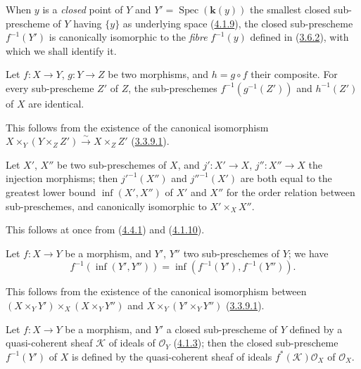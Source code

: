 When $y$ is a \emph{closed} point of $Y$ and
$Y'=\operatorname{Spec}(\boldsymbol{k}(y))$ the smallest closed sub-prescheme of $Y$ having
$\{y\}$ as underlying space (\hyperref[I.4.1.9]{4.1.9}), the
closed sub-prescheme $f^{-1}(Y')$ is canonically isomorphic to the
\emph{fibre} $f^{-1}(y)$ defined in (\hyperref[I.3.6.2]{3.6.2}), with
which we shall identify it.

\begin{corollary}[4.4.2]
\label{I.4.4.2}
Let $f:X\to Y$, $g:Y\to Z$ be two morphisms, and $h=g\circ f$ their
composite. For every sub-prescheme $Z'$ of $Z$, the sub-preschemes
$f^{-1}(g^{-1}(Z'))$ and $h^{-1}(Z')$ of $X$ are identical.
\end{corollary}

This follows from the existence of the canonical isomorphism
$X\times_Y(Y\times_Z Z')\xrightarrow{\sim}X\times_Z Z'$
(\hyperref[I.3.3.9.1]{3.3.9.1}).

\begin{corollary}[4.4.3]
\label{I.4.4.3}
Let $X'$, $X''$ be two sub-preschemes of $X$, and $j':X'\to X$,
$j'':X''\to X$ the injection morphisms; then ${j'}^{-1}(X'')$ and
${j''}^{-1}(X')$ are both equal to the greatest lower bound
$\inf(X',X'')$ of $X'$ and $X''$ for the order relation between
sub-preschemes, and canonically isomorphic to $X'\times_X X''$.
\end{corollary}

This follows at once from (\hyperref[I.4.4.1]{4.4.1}) and
(\hyperref[I.4.1.10]{4.1.10}).

\begin{corollary}[4.4.4]
\label{I.4.4.4}
Let $f:X\to Y$ be a morphism, and $Y'$, $Y''$ two sub-preschemes of $Y$;
we have
\[
  f^{-1}(\inf(Y',Y''))=\inf(f^{-1}(Y'),f^{-1}(Y'')).
\]
\end{corollary}

This follows from the existence of the canonical isomorphism between
$(X\times_Y Y')\times_X(X\times_Y Y'')$ and
$X\times_Y(Y'\times_Y Y'')$ (\hyperref[I.3.3.9.1]{3.3.9.1}).

\begin{proposition}[4.4.5]
\label{I.4.4.5}
Let $f:X\to Y$ be a morphism, and $Y'$ a closed sub-prescheme of $Y$ defined
by a quasi-coherent sheaf $\mathscr{K}$ of ideals of $\mathscr{O}_Y$
\textup{(\hyperref[I.4.1.3]{4.1.3})}; then the closed sub-prescheme $f^{-1}(Y')$ of
$X$ is defined by the quasi-coherent sheaf of ideals
$f^*(\mathscr{K})\mathscr{O}_X$ of $\mathscr{O}_X$.
\end{proposition}

